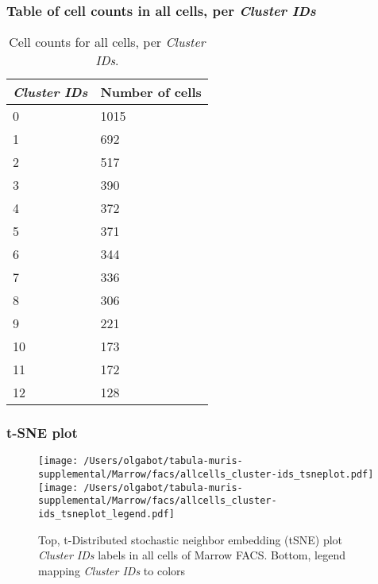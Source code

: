 \subsubsection{Table of cell counts in all cells, per \emph{Cluster IDs}}\begin{table}[h]
\centering
\label{my-label}
\begin{tabular}{@{}ll@{}}
\toprule

\emph{Cluster IDs}& Number of cells \\ \midrule
0 & 1015 \\

1 & 692 \\

2 & 517 \\

3 & 390 \\

4 & 372 \\

5 & 371 \\

6 & 344 \\

7 & 336 \\

8 & 306 \\

9 & 221 \\

10 & 173 \\

11 & 172 \\

12 & 128 \\
\bottomrule
\end{tabular}
\caption{Cell counts for all cells, per \emph{Cluster IDs}.}
\end{table}

\clearpage
\subsubsection{t-SNE plot}
\begin{figure}[h]
\centering
\texttt{[image: /Users/olgabot/tabula-muris-supplemental/Marrow/facs/allcells\_cluster-ids\_tsneplot.pdf]}
\texttt{[image: /Users/olgabot/tabula-muris-supplemental/Marrow/facs/allcells\_cluster-ids\_tsneplot\_legend.pdf]}
\caption{Top, t-Distributed stochastic neighbor embedding (tSNE) plot  \emph{Cluster IDs} labels in all cells of Marrow FACS. Bottom, legend mapping \emph{Cluster IDs} to colors}
\end{figure}


